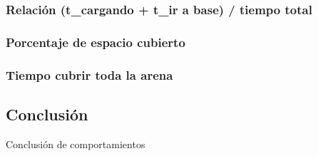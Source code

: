 \subsubsection{Relaci\'on (t\_cargando + t\_ir a base) / tiempo total}

\subsubsection{Porcentaje de espacio cubierto}

\subsubsection{Tiempo cubrir toda la arena}

\newpage
\subsection{Conclusi\'on}
\label{comp_conclusion}
Conclusi\'on de comportamientos

